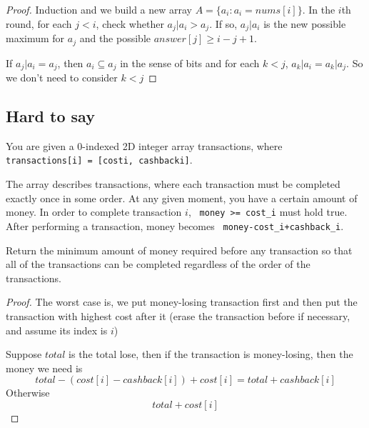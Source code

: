 \documentclass[11pt]{article}
\let\OldTexttt\texttt
\renewcommand{\texttt}[1]{\OldTexttt{\color{MidnightBlue} #1}}
\begin{document}
\begin{proof}
Induction and we build a new array \(A=\{a_i:a_i=nums[i]\}\). In the \(i\)th round, for
each \(j<i\), check whether \(a_j|a_i>a_j\). If so, \(a_j|a_i\) is the new possible maximum
for \(a_j\) and the possible \(answer[j]\ge i-j+1\).

If \(a_j|a_i=a_j\), then \(a_i\subseteq a_j\) in the sense of bits and for
each \(k<j\), \(a_k|a_i=a_k|a_j\). So we don't need to consider \(k<j\)
\end{proof}
\subsection{Hard to say}
\label{sec:orgb1961dd}
\begin{problem}
You are given a 0-indexed 2D integer array transactions, where \texttt{transactions[i] = [costi, cashbacki]}.

The array describes transactions, where each transaction must be completed exactly once in some
order. At any given moment, you have a certain amount of money. In order to complete transaction
\(i\), \texttt{money >= cost\_i} must hold true. After performing a transaction, money becomes \texttt{money-cost\_i+cashback\_i}.

Return the minimum amount of money required before any transaction so that all of the
transactions can be completed regardless of the order of the transactions.
\end{problem}

\begin{proof}
The worst case is, we put money-losing transaction first and then put the transaction with
highest cost after it (erase the transaction before if necessary, and assume its index is \(i\))

Suppose \(total\) is the total lose, then if the transaction is money-losing, then the money we need is
\begin{equation*}
total-(cost[i]-cashback[i])+cost[i] = total+cashback[i]
\end{equation*}
Otherwise
\begin{equation*}
total+cost[i]
\end{equation*}
\end{proof}
\end{document}
